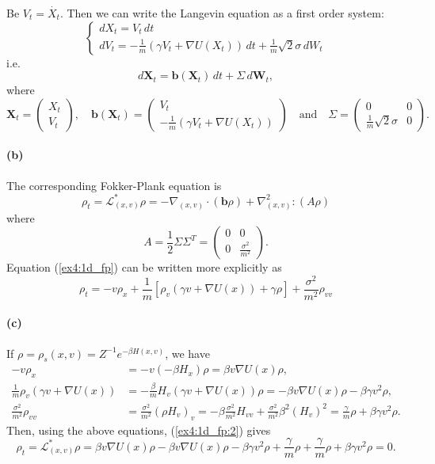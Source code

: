 \documentclass[a4paper,11pt]{article}
\theoremstyle{definition}
\theoremstyle{plain}
\theoremstyle{remark}
\begin{document}
Be $V_t = \dot{X_t}$. Then we can write the Langevin equation as a first order system:
$$
\begin{cases} dX_t = V_t\,dt \\ dV_t = -\frac{1}{m}(\gamma V_t + \nabla U(X_t))\,dt + \frac{1}{m}\sqrt{2}\sigma\,dW_t \end{cases}
$$
i.e.
$$
d\mathbf{X}_t = \mathbf{b}(\mathbf{X}_t)\,dt + \Sigma\,d\mathbf{W}_t,
$$
where
$$
\mathbf{X}_t = \left(\begin{matrix}
X_t \\ V_t
\end{matrix}\right), \quad \mathbf{b}(\mathbf{X}_t) = \left(\begin{matrix}
V_t \\ -\frac{1}{m}(\gamma V_t + \nabla U(X_t))
\end{matrix}\right) \quad \text{and} \quad \Sigma = \left(\begin{matrix}
0 & 0 \\ \frac{1}{m}\sqrt{2}\sigma & 0
\end{matrix}\right).
$$

\paragraph*{(b)}

The corresponding Fokker-Plank equation is
\begin{equation}
\rho_t = \mathcal{L}^*_{(x,v)} \rho = -\nabla_{(x,v)} \cdot (\mathbf{b}\rho) + \nabla^2_{(x,v)}:(A\rho)\label{ex4:1d_fp}
\end{equation}
where
$$
A = \frac{1}{2}\Sigma\Sigma^T = \left(\begin{matrix}
0 & 0 \\ 0 & \frac{\sigma^2}{m^2}
\end{matrix}\right).
$$
Equation (\ref{ex4:1d_fp}) can be written more explicitly as
\begin{equation}
\rho_t = -v\rho_x + \frac{1}{m}[\rho_v(\gamma v + \nabla U(x))+ \gamma\rho] + \frac{\sigma^2}{m^2}\rho_{vv}
\label{ex4:1d_fp:2}
\end{equation}

\paragraph*{(c)}

If $\rho = \rho_s(x,v) = Z^{-1}e^{-\beta H(x,v)}$, we have
\begin{align*}
-v\rho_x & = -v(-\beta H_x)\rho = \beta v \nabla U(x)\rho,
\\ \frac{1}{m}\rho_v(\gamma v + \nabla U(x)) & = -\frac{\beta}{m}H_v(\gamma v + \nabla U(x))\rho = -\beta v\nabla U(x)\rho - \beta\gamma v^2\rho,
\\ \frac{\sigma^2}{m^2}\rho_{vv} & = \frac{\sigma^2}{m^2}(\rho H_v)_v = -\beta\frac{\sigma^2}{m^2} H_{vv} +\frac{\sigma^2}{m^2}\beta^2(H_v)^2 = \frac{\gamma}{m}\rho + \beta\gamma v^2\rho.
\end{align*}
Then, using the above equations, (\ref{ex4:1d_fp:2}) gives
$$
\rho_t = \mathcal{L}^*_{(x,v)} \rho = \beta v \nabla U(x)\rho -\beta v\nabla U(x)\rho - \beta\gamma v^2\rho + \frac{\gamma}{m}\rho + \frac{\gamma}{m}\rho + \beta\gamma v^2\rho = 0.
$$
\end{document}
